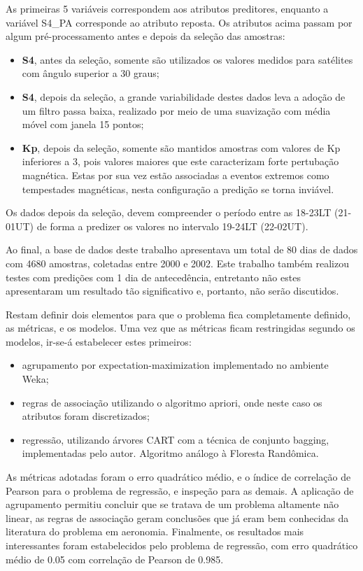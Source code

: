 As primeiras 5 variáveis correspondem aos atributos preditores, enquanto a variável S4\_PA corresponde ao atributo reposta. Os atributos acima passam por algum pré-processamento antes e depois da seleção das amostras:

\begin{itemize}
\item {\bf S4}, antes da seleção, somente são utilizados os valores medidos para satélites com ângulo superior a 30 graus;
\item {\bf S4}, depois da seleção, a grande variabilidade destes dados leva a adoção de um filtro passa baixa, realizado por meio de uma suavização com média móvel com janela 15 pontos;
\item {\bf Kp}, depois da seleção, somente são mantidos amostras com valores de Kp inferiores a 3, pois valores maiores que este caracterizam forte pertubação magnética. Estas por sua vez estão associadas a eventos extremos como tempestades magnéticas, nesta configuração a predição se torna inviável.
\end{itemize}

Os dados depois da seleção, devem compreender o período  entre as 18-23LT (21-01UT) de forma a predizer os valores no intervalo 19-24LT (22-02UT).

Ao final, a base de dados deste trabalho apresentava um total de 80 dias de dados com 4680 amostras, coletadas entre 2000 e 2002. Este trabalho também realizou testes com predições com 1 dia de antecedência, entretanto não estes apresentaram um resultado tão significativo e, portanto, não serão discutidos.

Restam definir dois elementos para que o problema fica completamente definido, as métricas, e os modelos. Uma vez que as métricas ficam restringidas segundo os modelos, ir-se-á estabelecer estes primeiros:

\begin{itemize}
\item agrupamento por expectation-maximization implementado no ambiente Weka;
\item regras de associação utilizando o algoritmo apriori, onde neste caso os atributos foram discretizados;
\item regressão, utilizando árvores CART com a técnica de conjunto bagging, implementadas pelo autor. Algoritmo análogo à Floresta Randômica.
\end{itemize}

As métricas adotadas foram o erro quadrático médio, e o índice de correlação de Pearson para o problema de regressão, e inspeção para as demais. A aplicação de agrupamento permitiu concluir que se tratava de um problema altamente não linear, as regras de associação geram conclusões que já eram bem conhecidas da literatura do problema em aeronomia. Finalmente, os resultados mais interessantes foram estabelecidos pelo problema de regressão, com erro quadrático médio de 0.05 com correlação de Pearson de 0.985.

